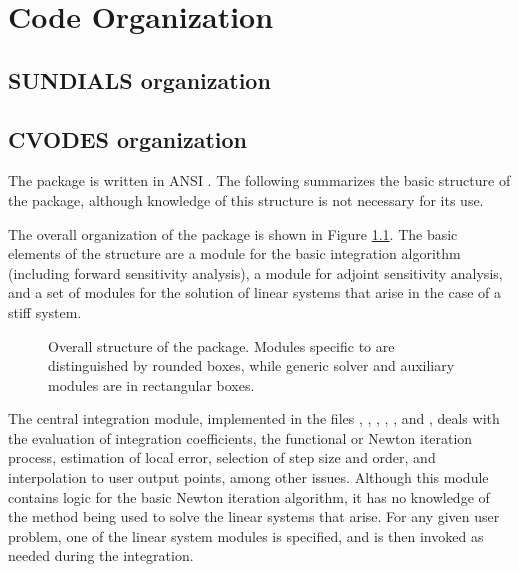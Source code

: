 \chapter{Code Organization}\label{s:organization}

\section{SUNDIALS organization}\label{ss:sun_org}


\section{CVODES organization}\label{ss:cvodes_org}

The {\cvodes} package is written in ANSI {\C}. The following
summarizes the basic structure of the package, although knowledge
of this structure is not necessary for its use.

The overall organization of the {\cvodes} package is shown in Figure
\ref{f:cvsorg}.  The basic elements of the structure are a module for
the basic integration algorithm (including forward sensitivity analysis),
a module for adjoint sensitivity analysis, and a set of modules for the solution
of linear systems that arise in the case of a stiff system.  
\begin{figure}
{\centerline{}}
\caption [Overall structure of the CVODES package]
{Overall structure of the {\cvodes} package.
  Modules specific to {\cvodes} are distinguished by rounded boxes, while 
  generic solver and auxiliary modules are in rectangular boxes.}
\label{f:cvsorg}
\end{figure}
The central integration module, implemented in the files ,
, , , ,
and , deals with the evaluation of integration coefficients,
the functional or Newton iteration process, estimation of local error,
selection of step size and order, and interpolation to user output
points, among other issues.  Although this module contains logic for
the basic Newton iteration algorithm, it has no knowledge of the
method being used to solve the linear systems that arise.  For any
given user problem, one of the linear system modules is specified, and
is then invoked as needed during the integration. 


